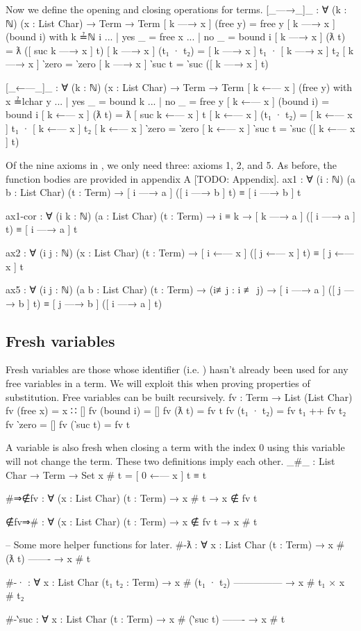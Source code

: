 \documentclass[logo,bsc,singlespacing,parskip,online]{infthesis}
\renewenvironment{code}{\mintedcopy[breaklines,breaksymbolleft=\;]{agda}}{\endmintedcopy}
\begin{document}
Now we define the opening and closing operations for terms.
\begin{code}
[_—→_]_ : ∀ (k : ℕ) (x : List Char) → Term → Term
[ k —→ x ] (free y) = free y
[ k —→ x ] (bound i) with k ≟ℕ i
... | yes _ = free x
... | no  _ = bound i
[ k —→ x ] (ƛ t) = ƛ ([ suc k —→ x ] t)
[ k —→ x ] (t₁ · t₂) = [ k —→ x ] t₁ · [ k —→ x ] t₂
[ k —→ x ] ‵zero = ‵zero
[ k —→ x ] ‵suc t = ‵suc ([ k —→ x ] t)

[_←—_]_ : ∀ (k : ℕ) (x : List Char) → Term → Term
[ k ←— x ] (free y) with x ≟lchar y
... | yes _ = bound k
... | no  _ = free y
[ k ←— x ] (bound i) = bound i
[ k ←— x ] (ƛ t) = ƛ [ suc k ←— x ] t
[ k ←— x ] (t₁ · t₂) = [ k ←— x ] t₁ · [ k ←— x ] t₂
[ k ←— x ] ‵zero = ‵zero
[ k ←— x ] ‵suc t = ‵suc ([ k ←— x ] t)
\end{code}

Of the nine axioms in \citet{pitts_locally_2023}, we only need three: axioms 1, 2, and 5. As before,
the function bodies are provided in appendix A [TODO: Appendix].
\begin{code}
ax1 : ∀ (i : ℕ) (a b : List Char) (t : Term)
  → [ i —→ a ] ([ i —→ b ] t) ≡ [ i —→ b ] t

ax1-cor : ∀ (i k : ℕ) (a : List Char) (t : Term)
  → i ≡ k
  → [ k —→ a ] ([ i —→ a ] t) ≡ [ i —→ a ] t

ax2 : ∀ (i j : ℕ) (x : List Char) (t : Term)
  → [ i ←— x ] ([ j ←— x ] t) ≡ [ j ←— x ] t

ax5 : ∀ (i j : ℕ) (a b : List Char) (t : Term) → (i≢j : i ≢ j)
  → [ i —→ a ] ([ j —→ b ] t) ≡ [ j —→ b ] ([ i —→ a ] t)
\end{code}

\subsection{Fresh variables}
Fresh variables are those whose identifier (i.e. ) hasn't already been used for any
free variables in a term. We will exploit this when proving properties of substitution. Free
variables can be built recursively.
\begin{code}
fv : Term → List (List Char)
fv (free x) = x ∷ []
fv (bound i) = []
fv (ƛ t) = fv t
fv (t₁ · t₂) = fv t₁ ++ fv t₂
fv ‵zero = []
fv (‵suc t) = fv t
\end{code}

A variable is also fresh when closing a term with the index 0 using this variable will not change
the term. These two definitions imply each other.
\begin{code}
_#_ : List Char → Term → Set
x # t = [ 0 ←— x ] t ≡ t

#⇒∉fv : ∀ (x : List Char) (t : Term) → x # t → x ∉ fv t

∉fv⇒# : ∀ (x : List Char) (t : Term) → x ∉ fv t → x # t

-- Some more helper functions for later.
#-ƛ : ∀ {x : List Char} (t : Term)
  → x # (ƛ t)
    -------
  → x # t

#-· : ∀ {x : List Char} (t₁ t₂ : Term)
  → x # (t₁ · t₂)
    ---------------
  → x # t₁ × x # t₂

#-‵suc : ∀ {x : List Char} (t : Term)
  → x # (‵suc t)
    -------
  → x # t
\end{code}
\end{document}
